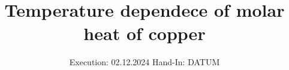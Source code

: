 

\subject{v47}
\title{Temperature dependece of molar heat of copper}
\date{%
  Execution: 02.12.2024
  \hspace{3em}
  Hand-In: DATUM
}



\maketitle
\thispagestyle{empty}
\tableofcontents
\newpage






\printbibliography{}


